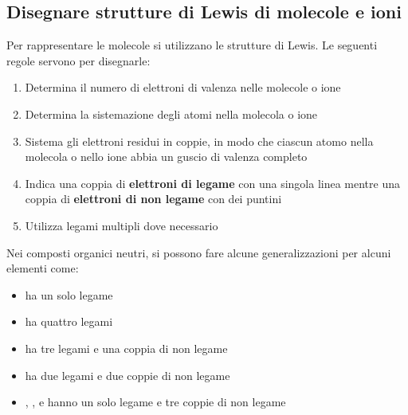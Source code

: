\subsection{Disegnare strutture di Lewis di molecole e ioni}
Per rappresentare le molecole si utilizzano le strutture di Lewis. Le seguenti regole servono per disegnarle:
\begin{enumerate}
	\item Determina il numero di elettroni di valenza nelle molecole o ione
	\item Determina la sistemazione degli atomi nella molecola o ione
	\item  Sistema gli elettroni residui in coppie, in modo che ciascun atomo nella molecola o nello ione abbia un guscio di valenza completo
	\item Indica una coppia di \textbf{elettroni di legame} con una singola linea mentre una coppia di \textbf{ elettroni di non legame} con dei puntini
	\item Utilizza legami multipli dove necessario
\end{enumerate}
Nei composti organici neutri, si possono fare alcune generalizzazioni per alcuni elementi come:
\begin{itemize}
	\item {} ha un solo legame
	\item {} ha quattro legami
	\item {} ha tre legami e una coppia di non legame
	\item {} ha due legami e due coppie di non legame
	\item {}, ,  e  hanno un solo legame e tre coppie di non legame
\end{itemize}

